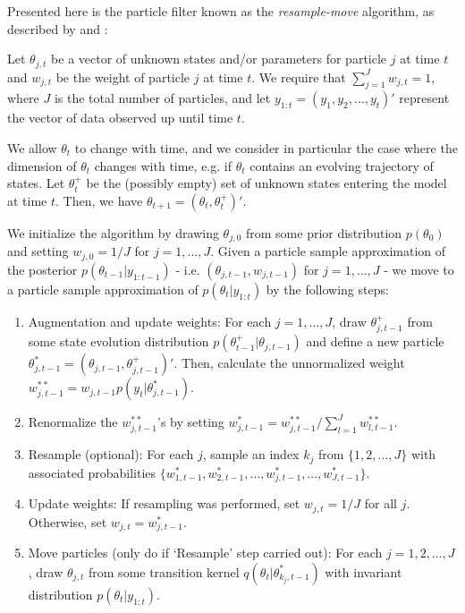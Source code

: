 \documentclass{article}
\begin{document}
Presented here is the particle filter known as the \emph{resample-move} algorithm, as described by \citet{Gilk:Berz:foll:2001} and \citet{Berz:gilk:2001}:

Let $\theta_{j,t}$ be a vector of unknown states and/or parameters for particle $j$ at time $t$ and $w_{j,t}$ be the weight of particle $j$ at time $t$. We require that $\sum_{j=1}^J w_{j,t} = 1$, where $J$ is the total number of particles, and let $y_{1:t} = (y_1,y_2,\ldots,y_t)'$ represent the vector of data observed up until time $t$.

We allow $\theta_t$ to change with time, and we consider in particular the case where the dimension of $\theta_t$ changes with time, e.g. if $\theta_t$ contains an evolving trajectory of states. Let $\theta^{+}_t$ be the (possibly empty) set of unknown states entering the model at time $t$. Then, we have $\theta_{t+1} = (\theta_t,\theta^{+}_t)'$.

We initialize the algorithm by drawing $\theta_{j,0}$ from some prior distribution $p(\theta_0)$ and setting $w_{j,0} = 1 / J$ for $j = 1,\ldots,J$. Given a particle sample approximation of the posterior $p(\theta_{t-1}|y_{1:t-1})$ - i.e. $\left(\theta_{j,t-1}, w_{j,t-1}\right)$ for $j=1,\ldots,J$ - we move to a particle sample approximation of $p(\theta_t|y_{1:t})$ by the following steps:

\begin{enumerate}
\item Augmentation and update weights: For each $j = 1,\ldots,J$, draw $\theta^{+}_{j,t-1}$ from some state evolution distribution $p(\theta^{+}_{t-1}|\theta_{j,t-1})$ and define a new particle $\theta^{*}_{j,t-1} = (\theta_{j,t-1},\theta^{+}_{j,t-1})'$. Then, calculate the unnormalized weight $w^{**}_{j,t-1} = w_{j,t-1}p(y_t|\theta^{*}_{j,t-1})$.
\item Renormalize the $w^{**}_{j,t-1}$'s by setting $w^{*}_{j,t-1} = w^{**}_{j,t-1} / \sum_{l=1}^J w^{**}_{l,t-1}$.
\item Resample (optional): For each $j$, sample an index $k_j$ from $\{1,2,\ldots,J\}$ with associated probabilities $\{w^{*}_{1,t-1},w^{*}_{2,t-1},\ldots,w^{*}_{j,t-1},\ldots,w^{*}_{J,t-1}\}$.
\item Update weights: If resampling was performed, set $w_{j,t} = 1 / J$ for all $j$. Otherwise, set $w_{j,t} = w^{*}_{j,t-1}$.
\item Move particles (only do if `Resample' step carried out): For each $j = 1,2,\ldots,J$, draw $\theta_{j,t}$ from some transition kernel $q(\theta_t|\theta^{*}_{k_j,t-1})$ with invariant distribution $p(\theta_t|y_{1:t})$.
\end{enumerate}

\clearpage



\end{document}
